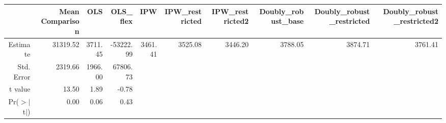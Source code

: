 \begin{table}[ht]
\centering
\begin{tabular}{rrrrrrrrrr}
  \hline
 & Mean Comparison & OLS & OLS\_flex & IPW & IPW\_restricted & IPW\_restricted2 & Doubly\_robust\_base & Doubly\_robust\_restricted & Doubly\_robust\_restricted2 \\ 
  \hline
Estimate & 31319.52 & 3711.45 & -53222.99 & 3461.41 & 3525.08 & 3446.20 & 3788.05 & 3874.71 & 3761.41 \\ 
  Std. Error & 2319.66 & 1966.00 & 67806.73 &  &  &  &  &  &  \\ 
  t value & 13.50 & 1.89 & -0.78 &  &  &  &  &  &  \\ 
  Pr($>$$|$t$|$) & 0.00 & 0.06 & 0.43 &  &  &  &  &  &  \\ 
   \hline
\end{tabular}
\end{table}

